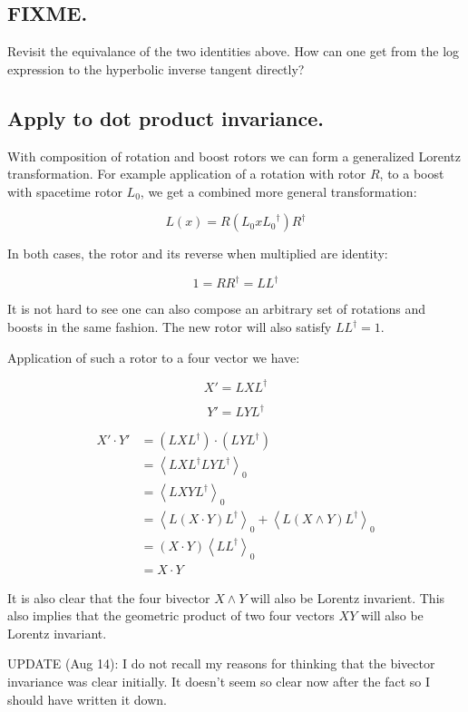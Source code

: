 \documentclass{article}      %
\newcommand{\gpgrade}[2] {{\left\langle{{#1}}\right\rangle}_{#2}}
\newcommand{\gpgradezero}[1] {\gpgrade{#1}{0}}
\begin{document}
\subsection{ FIXME. }

Revisit the equivalance of the two identities above.  How can one get from the log
expression to the hyperbolic inverse tangent directly?

\subsection{ Apply to dot product invariance. }

With composition of rotation and boost rotors we can form a generalized Lorentz transformation.  For example application of a rotation with rotor $R$, to a boost with spacetime rotor $L_0$, we get a combined more general transformation:

\begin{equation*}
L(x) = R ( L_0 x {L_0}^\dagger ) R^\dagger
\end{equation*}

In both cases, the rotor and its reverse when multiplied are identity:

\begin{equation*}
1 = R R^\dagger = L L^\dagger
\end{equation*}

It is not hard to see one can also compose an arbitrary set of rotations and boosts in the same fashion.  The new rotor will also satisfy $L L^\dagger = 1$.

Application of such a rotor to a four vector we have:

\begin{equation*}
X' = L X L^\dagger
\end{equation*}

\begin{equation*}
Y' = L Y L^\dagger
\end{equation*}

\begin{align*}
X' \cdot Y' &= (L X L^\dagger) \cdot (L Y L^\dagger) \\
&= \gpgradezero{ L X L^\dagger L Y L^\dagger } \\
&= \gpgradezero{ L X Y L^\dagger } \\
&= \gpgradezero{ L (X \cdot Y) L^\dagger } + \gpgradezero{ L (X \wedge Y) L^\dagger } \\
&= (X \cdot Y) \gpgradezero{ L L^\dagger } \\
&= X \cdot Y
\end{align*}

It is also clear that the four bivector $X \wedge Y$ will also be Lorentz invarient.  This also implies that the geometric product of two four vectors $X Y$ will also be Lorentz invariant.

UPDATE (Aug 14): I 
do not 
recall my reasons for thinking that the bivector invariance was clear initially.  It doesn't seem so clear now after the fact so I should have written it down.
\end{document}
